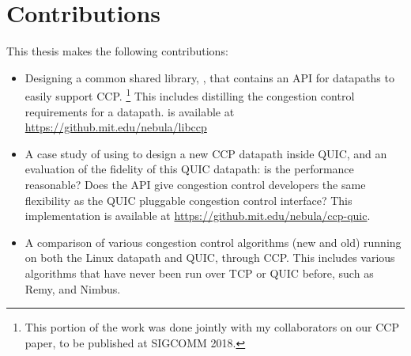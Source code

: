 \section{Contributions}
This thesis makes the following contributions:
\begin{itemize}
    \item Designing a common shared library, \libccp, that contains an API for datapaths to easily support CCP. \footnote{This portion of the work was done jointly with my collaborators on our CCP paper, to be published at SIGCOMM 2018.} This includes distilling the congestion control requirements for a datapath. \libccp is available at \url{https://github.mit.edu/nebula/libccp}
    \item A case study of using \libccp to design a new CCP datapath inside QUIC, and an evaluation of the fidelity of this QUIC datapath: is the performance reasonable? Does the API give congestion control developers the same flexibility as the QUIC pluggable congestion control interface? This implementation is available at \url{https://github.mit.edu/nebula/ccp-quic}.
    \item A comparison of various congestion control algorithms (new and old) running on both the Linux datapath and QUIC, through CCP. This includes various algorithms that have never been run over TCP or QUIC before, such as Remy, and Nimbus.
\end{itemize}





